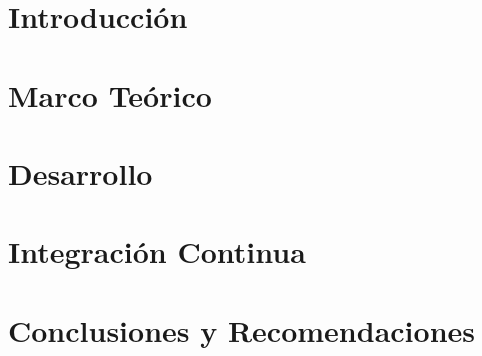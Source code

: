 \documentclass{report}
\begin{document}
  

  \chapter{Introducción}
  

  \chapter{Marco Teórico}
  

  \chapter{Desarrollo}
  

  \chapter{Integración Continua}
  

  \chapter{Conclusiones y Recomendaciones}
  

  
\end{document}

